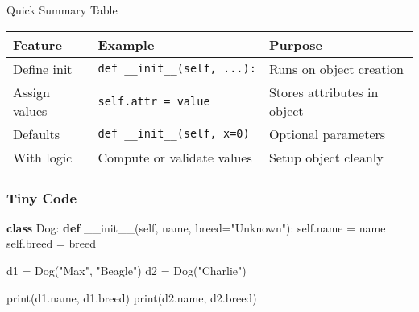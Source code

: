 \documentclass[
  letterpaper,
  DIV=11,
  numbers=noendperiod]{scrreprt}
\newenvironment{Shaded}{\begin{snugshade}}{\end{snugshade}}
\newcommand{\BuiltInTok}[1]{\textcolor[rgb]{0.00,0.23,0.31}{#1}}
\newcommand{\FunctionTok}[1]{\textcolor[rgb]{0.28,0.35,0.67}{#1}}
\newcommand{\KeywordTok}[1]{\textcolor[rgb]{0.00,0.23,0.31}{\textbf{#1}}}
\newcommand{\NormalTok}[1]{\textcolor[rgb]{0.00,0.23,0.31}{#1}}
\newcommand{\OperatorTok}[1]{\textcolor[rgb]{0.37,0.37,0.37}{#1}}
\newcommand{\StringTok}[1]{\textcolor[rgb]{0.13,0.47,0.30}{#1}}
\newcommand{\VariableTok}[1]{\textcolor[rgb]{0.07,0.07,0.07}{#1}}
\begin{document}
Quick Summary Table

\begin{longtable}[]{@{}
  >{\raggedright\arraybackslash}p{}
  >{\raggedright\arraybackslash}p{}
  >{\raggedright\arraybackslash}p{}@{}}
\toprule\noalign{}
\begin{minipage}[b]{\linewidth}\raggedright
Feature
\end{minipage} & \begin{minipage}[b]{\linewidth}\raggedright
Example
\end{minipage} & \begin{minipage}[b]{\linewidth}\raggedright
Purpose
\end{minipage} \\
\midrule\noalign{}
\endhead
\bottomrule\noalign{}
\endlastfoot
Define init & \texttt{def\ \_\_init\_\_(self,\ ...):} & Runs on object
creation \\
Assign values & \texttt{self.attr\ =\ value} & Stores attributes in
object \\
Defaults & \texttt{def\ \_\_init\_\_(self,\ x=0)} & Optional
parameters \\
With logic & Compute or validate values & Setup object cleanly \\
\end{longtable}

\subsubsection{Tiny Code}\label{tiny-code-62}

\begin{Shaded}
\begin{Highlighting}[]
\KeywordTok{class}\NormalTok{ Dog:}
    \KeywordTok{def} \FunctionTok{\_\_init\_\_}\NormalTok{(}\VariableTok{self}\NormalTok{, name, breed}\OperatorTok{=}\StringTok{"Unknown"}\NormalTok{):}
        \VariableTok{self}\NormalTok{.name }\OperatorTok{=}\NormalTok{ name}
        \VariableTok{self}\NormalTok{.breed }\OperatorTok{=}\NormalTok{ breed}

\NormalTok{d1 }\OperatorTok{=}\NormalTok{ Dog(}\StringTok{"Max"}\NormalTok{, }\StringTok{"Beagle"}\NormalTok{)}
\NormalTok{d2 }\OperatorTok{=}\NormalTok{ Dog(}\StringTok{"Charlie"}\NormalTok{)}

\BuiltInTok{print}\NormalTok{(d1.name, d1.breed)}
\BuiltInTok{print}\NormalTok{(d2.name, d2.breed)}
\end{Highlighting}
\end{Shaded}
\end{document}
